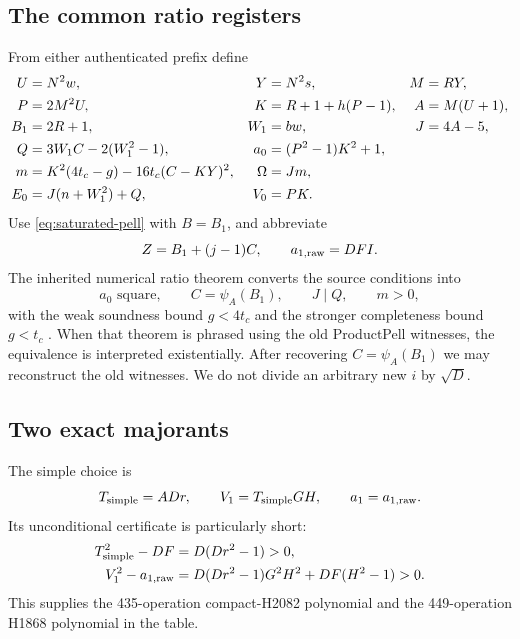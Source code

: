 \subsection{The common ratio registers}

From either authenticated prefix define
\begin{align}
 U&=N^2w,&Y&=N^2s,&M&=RY,\notag\\
 P&=2M^2U,&K&=R+1+h(P-1),&A&=M(U+1),\notag\\
 B_1&=2R+1,&W_1&=bw,&J&=4A-5,\notag\\
 Q&=3W_1C-2(W_1^2-1),&
 a_0&=(P^2-1)K^2+1,\notag\\
 m&=K^2(4t_c-g)-16t_c(C-KY)^2,&
 \Omega&=Jm,\notag\\
 E_0&=J(n+W_1^2)+Q,&V_0&=PK. \label{eq:nine-ratio}
\end{align}
Use \eqref{eq:saturated-pell} with \(B=B_1\), and abbreviate
\[
 Z=B_1+(j-1)C,\qquad a_{1,\rm raw}=DFI.
\]
The inherited numerical ratio theorem converts the source conditions into
\[
 a_0\text{ square},\qquad C=\psi_A(B_1),\qquad
 J\mid Q,\qquad m>0,
 \label{eq:nine-ratio-contract}
\]
with the weak soundness bound \(g<4t_c\) and the stronger completeness bound
\(g<t_c\) \cite{jones,source71,productpell}.
When that theorem is phrased using the old ProductPell witnesses, the
equivalence is interpreted existentially. After recovering \(C=\psi_A(B_1)\)
we may reconstruct the old witnesses. We do not divide an arbitrary new
\(i\) by \(\sqrt D\).

\subsection{Two exact majorants}

The simple choice is
\begin{equation}
 T_{\rm simple}=ADr,\qquad V_1=T_{\rm simple}GH,\qquad
 a_1=a_{1,\rm raw}.
 \label{eq:simple-majorant}
\end{equation}
Its unconditional certificate is particularly short:
\begin{align}
 T_{\rm simple}^2-DF&=D(Dr^2-1)>0,\notag\\
 V_1^2-a_{1,\rm raw}
 &=D(Dr^2-1)G^2H^2+DF(H^2-1)>0.
 \label{eq:simple-majorant-certificate}
\end{align}
This supplies the 435-operation compact-H2082 polynomial and the
449-operation H1868 polynomial in the table.

